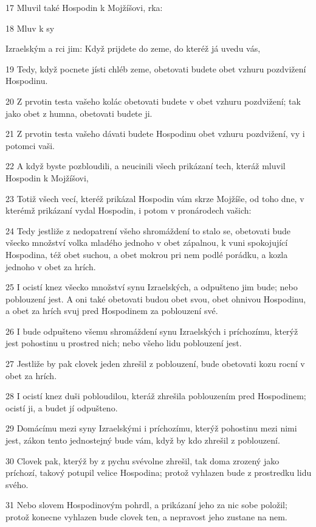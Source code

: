 \par 17 Mluvil také Hospodin k Mojžíšovi, rka:
\par 18 Mluv k sy\par Izraelským a rci jim: Když prijdete do zeme, do kteréž já uvedu vás,
\par 19 Tedy, když pocnete jísti chléb zeme, obetovati budete obet vzhuru pozdvižení Hospodinu.
\par 20 Z prvotin testa vašeho kolác obetovati budete v obet vzhuru pozdvižení; tak jako obet z humna, obetovati budete ji.
\par 21 Z prvotin testa vašeho dávati budete Hospodinu obet vzhuru pozdvižení, vy i potomci vaši.
\par 22 A když byste pozbloudili, a neucinili všech prikázaní tech, kteráž mluvil Hospodin k Mojžíšovi,
\par 23 Totiž všech vecí, kteréž prikázal Hospodin vám skrze Mojžíše, od toho dne, v kterémž prikázaní vydal Hospodin, i potom v pronárodech vašich:
\par 24 Tedy jestliže z nedopatrení všeho shromáždení to stalo se, obetovati bude všecko množství volka mladého jednoho v obet zápalnou, k vuni spokojující Hospodina, též obet suchou, a obet mokrou pri nem podlé porádku, a kozla jednoho v obet za hrích.
\par 25 I ocistí knez všecko množství synu Izraelských, a odpušteno jim bude; nebo poblouzení jest. A oni také obetovati budou obet svou, obet ohnivou Hospodinu, a obet za hrích svuj pred Hospodinem za poblouzení své.
\par 26 I bude odpušteno všemu shromáždení synu Izraelských i príchozímu, kterýž jest pohostinu u prostred nich; nebo všeho lidu poblouzení jest.
\par 27 Jestliže by pak clovek jeden zhrešil z poblouzení, bude obetovati kozu rocní v obet za hrích.
\par 28 I ocistí knez duši pobloudilou, kteráž zhrešila poblouzením pred Hospodinem; ocistí ji, a budet jí odpušteno.
\par 29 Domácímu mezi syny Izraelskými i príchozímu, kterýž pohostinu mezi nimi jest, zákon tento jednostejný bude vám, když by kdo zhrešil z poblouzení.
\par 30 Clovek pak, kterýž by z pychu svévolne zhrešil, tak doma zrozený jako príchozí, takový potupil velice Hospodina; protož vyhlazen bude z prostredku lidu svého.
\par 31 Nebo slovem Hospodinovým pohrdl, a prikázaní jeho za nic sobe položil; protož konecne vyhlazen bude clovek ten, a nepravost jeho zustane na nem.
